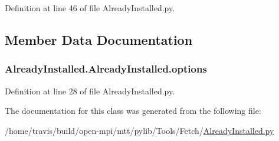 Definition at line 46 of file Already\-Installed.\-py.



\subsection{Member Data Documentation}
\hypertarget{classAlreadyInstalled_1_1AlreadyInstalled_af9247ff7a3b5dab409644868b7cc34e3}{
\subsubsection[{options}]{\setlength{\rightskip}{0pt plus 5cm}Already\-Installed.\-Already\-Installed.\-options}}\label{classAlreadyInstalled_1_1AlreadyInstalled_af9247ff7a3b5dab409644868b7cc34e3}


Definition at line 28 of file Already\-Installed.\-py.



The documentation for this class was generated from the following file\-:\begin{DoxyCompactItemize}
\item 
/home/travis/build/open-\/mpi/mtt/pylib/\-Tools/\-Fetch/\hyperlink{AlreadyInstalled_8py}{Already\-Installed.\-py}\end{DoxyCompactItemize}

